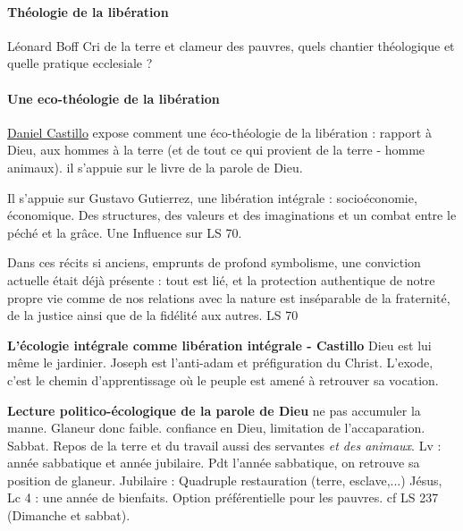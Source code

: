 \label{Comment:MemoireISTR5}  
\paragraph{Théologie de la libération} Léonard Boff
{Cri de la terre et clameur des pauvres, quels chantier théologique et quelle pratique ecclesiale ?} \cite{thomasset_recherche_2020}
 


\paragraph{Une eco-théologie de la libération} 
\href{https://www.loyola.edu/academics/theology/faculty/castillo}{Daniel Castillo} expose comment une éco-théologie  de la libération : rapport à Dieu, aux hommes à la terre (et de tout ce qui provient de la terre - homme animaux).   il s'appuie sur le livre de la parole de Dieu. 


Il s'appuie sur Gustavo Gutierrez, une libération intégrale : socioéconomie, économique. Des structures, des valeurs et des imaginations et un combat entre le péché et la grâce. Une Influence sur LS 70.
 
\begin{singlequote}
    Dans ces récits si anciens, emprunts de profond symbolisme, une conviction actuelle était déjà présente : tout est lié, et la protection authentique de notre propre vie comme de nos relations avec la nature est inséparable de la fraternité, de la justice ainsi que de la fidélité aux autres. LS 70
\end{singlequote}
 

\textbf{L'écologie intégrale comme libération intégrale - Castillo} 
 Dieu est lui même le jardinier. Joseph est l'anti-adam et préfiguration du Christ.  L'exode, c'est le chemin d'apprentissage où le peuple est amené à retrouver sa vocation. 

\textbf{Lecture politico-écologique de la parole de Dieu} ne pas accumuler la manne. Glaneur donc faible. confiance en Dieu, limitation de l'accaparation.
Sabbat. Repos de la terre et du travail aussi des servantes \textit{et des animaux}. Lv : année sabbatique et année jubilaire. Pdt l’année sabbatique, on retrouve sa position de glaneur. Jubilaire : Quadruple restauration (terre, esclave,...) Jésus, Lc 4 : une année de bienfaits. Option préférentielle
pour les pauvres. cf LS 237 (Dimanche et sabbat).




